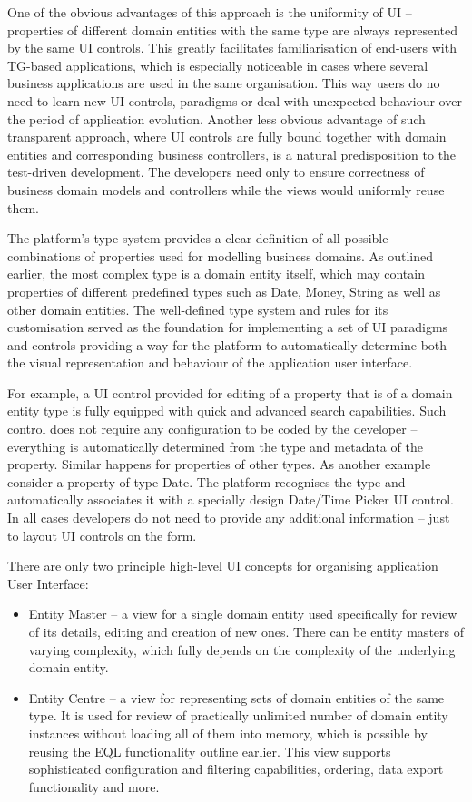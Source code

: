   One of the obvious advantages of this approach is the uniformity of UI -- properties of different domain entities with the same type are always represented by the same UI controls.
  This greatly facilitates familiarisation of end-users with TG-based applications, which is especially noticeable in cases where several business applications are used in the same organisation.
  This way users do no need to learn new UI controls, paradigms or deal with unexpected behaviour over the period of application evolution.
  Another less obvious advantage of such transparent approach, where UI controls are fully bound together with domain entities and corresponding business controllers, is a natural predisposition to the test-driven development.
  The developers need only to ensure correctness of business domain models and controllers while the views would uniformly reuse them.

  The platform's type system provides a clear definition of all possible combinations of properties used for modelling business domains.
  As outlined earlier, the most complex type is a domain entity itself, which may contain properties of different predefined types such as Date, Money, String as well as other domain entities.
  The well-defined type system and rules for its customisation served as the foundation for implementing a set of UI paradigms and controls providing a way for the platform to automatically determine both the visual representation and behaviour of the application user interface.
    
  For example, a UI control provided for editing of a property that is of a domain entity type is fully equipped with quick and advanced search capabilities.
  Such control does not require any configuration to be coded by the developer -- everything is automatically determined from the type and metadata of the property.
  Similar happens for properties of other types.
  As another example consider a property of type Date.
  The platform recognises the type and automatically associates it with a specially design Date/Time Picker UI control.
  In all cases developers do not need to provide any additional information -- just to layout UI controls on the form.
  
  There are only two principle high-level UI concepts for organising application User Interface:
  \begin{itemize}
   \item Entity Master -- a view for a single domain entity used specifically for review of its details, editing and creation of new ones.
	 There can be entity masters of varying complexity, which fully depends on the complexity of the underlying domain entity.
    \item Entity Centre -- a view for representing sets of domain entities of the same type. 
	  It is used for review of practically unlimited number of domain entity instances without loading all of them into memory, which is possible by reusing the EQL functionality outline earlier.
	  This view supports sophisticated configuration and filtering capabilities, ordering, data export functionality and more.
  \end{itemize}
  
